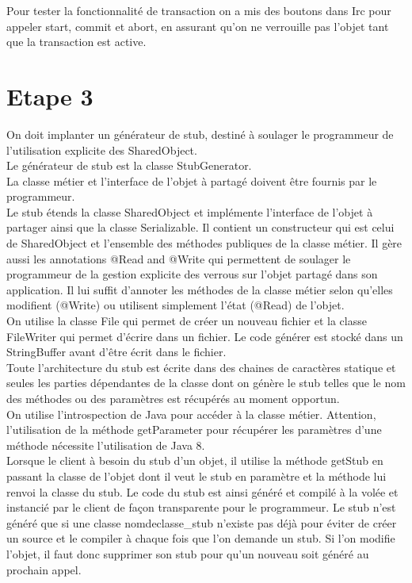 \documentclass[a4paper,12pt]{article}
\begin{document}
Pour tester la fonctionnalité de transaction on a mis des boutons dans Irc pour appeler start, commit et abort, en assurant qu’on ne verrouille pas l’objet tant que la transaction est active. 

\clearpage
\section{Etape 3}

\bigskip
\bigskip

On doit  implanter un générateur de stub, destiné à soulager le programmeur de l'utilisation explicite des SharedObject. \\

Le générateur de stub est la classe StubGenerator.\\
La classe métier et l'interface de l'objet à partagé doivent être fournis par le programmeur.\\

Le stub étends la classe SharedObject et implémente l'interface de l'objet à partager ainsi que la classe Serializable.
Il contient un constructeur qui est celui de SharedObject et l'ensemble des méthodes publiques de la classe métier.
Il gère aussi les annotations @Read and @Write qui permettent de soulager le programmeur de la gestion explicite des verrous sur l'objet partagé dans son application. Il lui suffit d'annoter les méthodes de la classe métier selon qu'elles modifient (@Write) ou utilisent simplement l'état (@Read) de l'objet. \\

On utilise la classe File qui permet de créer un nouveau fichier et la classe FileWriter qui permet d'écrire dans un fichier. Le code générer est stocké dans un StringBuffer avant d'être écrit dans le fichier.\\
Toute l'architecture du stub est écrite dans des chaines de caractères statique et seules les parties dépendantes de la classe dont on génère le stub telles que le nom des méthodes ou des paramètres est récupérés au moment opportun.\\
 On utilise l'introspection de Java pour accéder à la classe métier. Attention, l'utilisation de la méthode getParameter pour récupérer les paramètres d'une méthode nécessite l'utilisation de Java 8.\\

Lorsque le client à besoin du stub d'un objet, il utilise la méthode getStub en passant la classe de l'objet dont il veut le stub en paramètre et la méthode lui renvoi la classe du stub. Le code du stub est ainsi généré et compilé à la volée et instancié par le client de façon transparente pour le programmeur. Le stub n'est généré que si une classe nomdeclasse\_stub n'existe pas déjà pour éviter de créer un source et le compiler à chaque fois que l'on demande un stub. Si l'on modifie l'objet, il faut donc supprimer son stub pour qu'un nouveau soit généré au prochain appel.\\
\end{document}
